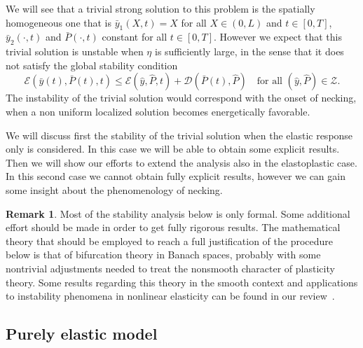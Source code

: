 \documentclass[a4paper,10pt,twoside]{amsbook}
\numberwithin{section}{chapter}
\numberwithin{equation}{chapter}
\theoremstyle{definition}
\newtheorem{rmk}[prop]{Remark}
\begin{document}
We will see that a trivial strong solution to this problem is the spatially homogeneous one that is $\bar{y}_1(X,t)=X$ for all $X\in(0,L)$ and $t\in[0,T]$, $\bar{y}_2(\cdot,t)$ and $\bar{P}(\cdot,t)$ constant for all $t\in[0,T]$. However we expect that this trivial solution is unstable when $\eta$ is sufficiently large, in the sense that it does not satisfy the global stability condition
\[
\mathcal{E}(\bar{y}(t),\bar{P}(t),t)\le\mathcal{E}(\hat y,\hat P,t)+\mathcal{D}(\bar P(t),\hat P)\quad\text{for all $(\hat y,\hat P)\in\mathscr{Z}$}.
\]
The instability of the trivial solution would correspond with the onset of necking, when a non uniform localized solution becomes energetically favorable.

We will discuss first the stability of the trivial solution when the elastic response only is considered. In this case we will be able to obtain some explicit results. Then we will show our efforts to extend the analysis also in the elastoplastic case. In this second case we cannot obtain fully explicit results, however we can gain some insight about the phenomenology of necking.
\begin{rmk}
Most of the stability analysis below is only formal. Some additional effort should be made in order to get fully rigorous results. The mathematical theory that should be employed to reach a full justification of the procedure below is that of bifurcation theory in Banach spaces, probably with some nontrivial adjustments needed to treat the nonsmooth character of plasticity theory. Some results regarding this theory in the smooth context and applications to instability phenomena in nonlinear elasticity can be found in our review~\cite{progetto-ponno}.
\end{rmk}

\subsection{Purely elastic model}
\end{document}
